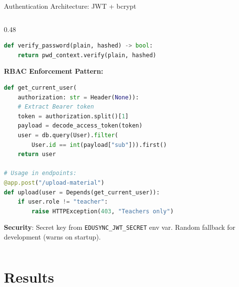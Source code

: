 \documentclass[aspectratio=169,10pt]{beamer}
\begin{document}
\begin{frame}{Authentication Architecture: JWT + bcrypt}
\begin{columns}[T]
\begin{column}{0.48\textwidth}
\begin{lstlisting}[language=Python, basicstyle=\ttfamily\tiny]
def verify_password(plain, hashed) -> bool:
    return pwd_context.verify(plain, hashed)
\end{lstlisting}

\vspace{4pt}
\footnotesize
\textbf{RBAC Enforcement Pattern:}
\begin{lstlisting}[language=Python, basicstyle=\ttfamily\tiny]
def get_current_user(
    authorization: str = Header(None)):
    # Extract Bearer token
    token = authorization.split()[1]
    payload = decode_access_token(token)
    user = db.query(User).filter(
        User.id == int(payload["sub"])).first()
    return user

# Usage in endpoints:
@app.post("/upload-material")
def upload(user = Depends(get_current_user)):
    if user.role != "teacher":
        raise HTTPException(403, "Teachers only")
\end{lstlisting}

\vspace{2pt}
\scriptsize
\textbf{Security}: Secret key from \texttt{EDUSYNC\_JWT\_SECRET} env var. Random fallback for development (warns on startup).
\end{column}
\end{columns}
\end{frame}

\section{Results}
\end{document}
